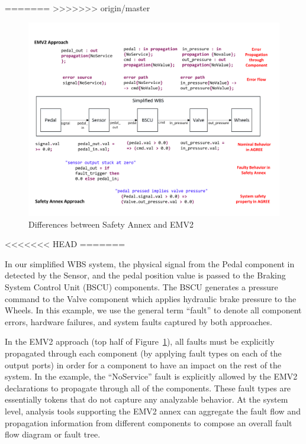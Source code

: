 =======
>>>>>>> origin/master
\begin{figure}[t]
	\vspace{-0.19in}
	\centering
	\includegraphics[trim=0 9 0 5,clip,width=\textwidth]{images/Comparison_with_EMV2.pdf}
	\caption{Differences between Safety Annex and EMV2}
	\label{fig:comparison_with_EMV2}
\end{figure} 
<<<<<<< HEAD
=======


In our simplified WBS system, the physical signal from the Pedal component in detected by the Sensor, and the pedal position value is passed to the Braking System Control Unit (BSCU) components.  The BSCU generates a pressure command to the Valve component which applies hydraulic brake pressure to the Wheels. In this example, we use the general term ``fault'' to denote all component errors, hardware failures, and system faults captured by both approaches.

In the EMV2 approach (top half of Figure~\ref{fig:comparison_with_EMV2}), all faults must be explicitly propagated through each component (by applying fault types on each of the output ports) in order for a component to have an impact on the rest of the system. In the example, the ``NoService'' fault is explicitly allowed by the EMV2 declarations to propagate through all of the components.  These fault types are essentially tokens that do not capture any analyzable behavior.  At the system level, analysis tools supporting the EMV2 annex can aggregate the fault flow and propagation information from different components to compose an overall fault flow diagram or fault tree.

